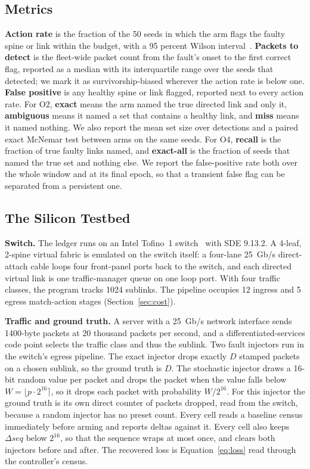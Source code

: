 \subsection{Metrics}

\textbf{Action rate} is the fraction of the 50 seeds in which the arm flags the faulty spine or link within the budget, with a 95 percent Wilson interval~\cite{wilson}. \textbf{Packets to detect} is the fleet-wide packet count from the fault's onset to the first correct flag, reported as a median with its interquartile range over the seeds that detected; we mark it as survivorship-biased wherever the action rate is below one. \textbf{False positive} is any healthy spine or link flagged, reported next to every action rate. For O2, \textbf{exact} means the arm named the true directed link and only it, \textbf{ambiguous} means it named a set that contains a healthy link, and \textbf{miss} means it named nothing. We also report the mean set size over detections and a paired exact McNemar test between arms on the same seeds. For O4, \textbf{recall} is the fraction of true faulty links named, and \textbf{exact-all} is the fraction of seeds that named the true set and nothing else. We report the false-positive rate both over the whole window and at its final epoch, so that a transient false flag can be separated from a persistent one.

\subsection{The Silicon Testbed}

\textbf{Switch.} The ledger runs on an Intel Tofino~1 switch~\cite{tofino} with SDE 9.13.2. A 4-leaf, 2-spine virtual fabric is emulated on the switch itself: a four-lane 25~Gb/s direct-attach cable loops four front-panel ports back to the switch, and each directed virtual link is one traffic-manager queue on one loop port. With four traffic classes, the program tracks 1024 sublinks. The pipeline occupies 12 ingress and 5 egress match-action stages (Section~\ref{sec:cost}).

\textbf{Traffic and ground truth.} A server with a 25~Gb/s network interface sends 1400-byte packets at 20 thousand packets per second, and a differentiated-services code point selects the traffic class and thus the sublink. Two fault injectors run in the switch's egress pipeline. The exact injector drops exactly $D$ stamped packets on a chosen sublink, so the ground truth is $D$. The stochastic injector draws a 16-bit random value per packet and drops the packet when the value falls below $W=\lfloor p\cdot 2^{16}\rceil$, so it drops each packet with probability $W/2^{16}$. For this injector the ground truth is its own direct counter of packets dropped, read from the switch, because a random injector has no preset count. Every cell reads a baseline census immediately before arming and reports deltas against it. Every cell also keeps $\Delta\mathit{seq}$ below $2^{16}$, so that the sequence wraps at most once, and clears both injectors before and after. The recovered loss is Equation~\eqref{eq:loss} read through the controller's census.


